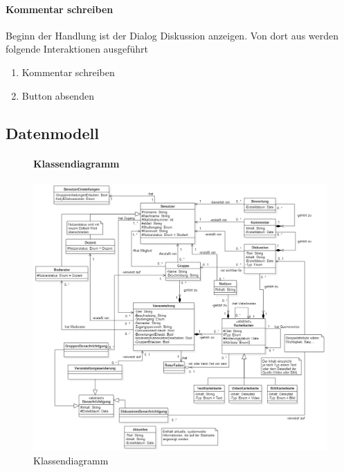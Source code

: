 \documentclass[12pt,a4paper]{article}
\begin{document}
{\paragraph{Kommentar schreiben}
Beginn der Handlung ist der Dialog \glqq Diskussion anzeigen\grqq. Von dort aus werden folgende Interaktionen ausgeführt
\begin{enumerate}
\item \glqq Kommentar schreiben\grqq
\item \glqq Button absenden\grqq
\end{enumerate}


\subsection{Datenmodell}

\begin{figure}[H]
	\centering
	\paragraph{Klassendiagramm}
	\includegraphics[width=\textwidth]{Bilder/Klassendiagramm/Klassendiagramm.png}
	\caption{Klassendiagramm}
	\label{vollstaendigesKlassendiagramm}
\end{figure}


}
\end{document}
